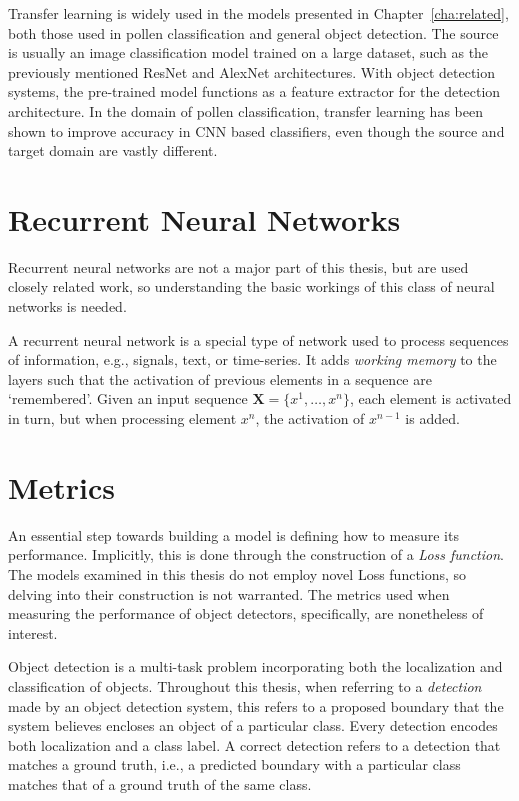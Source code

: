 Transfer learning is widely used in the models presented in Chapter~\ref{cha:related}, both those used in pollen classification and general object detection.
The source is usually an image classification model trained on a large dataset, such as the previously mentioned ResNet and AlexNet architectures.
With object detection systems, the pre-trained model functions as a feature extractor for the detection architecture.
In the domain of pollen classification, transfer learning has been shown to improve accuracy in CNN based classifiers, even though the source and target domain are vastly different.

\section{Recurrent Neural Networks}\label{sec:back-rnn}
Recurrent neural networks are not a major part of this thesis, but are used closely related work, so understanding the basic workings of this class of neural networks is needed.

A recurrent neural network is a special type of network used to process sequences of information, e.g., signals, text, or time-series.
It adds \textit{working memory} to the layers such that the activation of previous elements in a sequence are `remembered'.
Given an input sequence \(\mathbf{X}=\{x^1,\dots,x^n\} \), each element is activated in turn, but when processing element \(x^n\), the activation of \(x^{n-1}\) is added.

\section{Metrics}\label{sec:back-metrics}
An essential step towards building a model is defining how to measure its performance.
Implicitly, this is done through the construction of a \textit{Loss function}.
The models examined in this thesis do not employ novel Loss functions, so delving into their construction is not warranted.
The metrics used when measuring the performance of object detectors, specifically, are nonetheless of interest.

Object detection is a multi-task problem incorporating both the localization and classification of objects.
Throughout this thesis, when referring to a \textit{detection} made by an object detection system, this refers to a proposed boundary that the system believes encloses an object of a particular class.
Every detection encodes both localization and a class label.
A correct detection refers to a detection that matches a ground truth, i.e., a predicted boundary with a particular class matches that of a ground truth of the same class.

